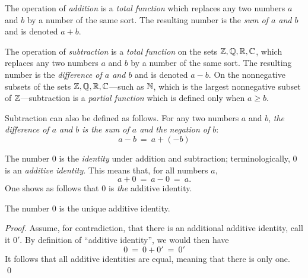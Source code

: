 The operation of {\it addition} is a {\em total function} which replaces any two numbers $a$ and $b$ by a number of the same sort.  The resulting number is the {\em sum of $a$ and $b$} and is denoted $a+b$.

\smallskip

 
\noindent
The operation of {\it subtraction} is a {\em total function} on the sets $\mathbb{Z}, \mathbb{Q}, \mathbb{R}, \mathbb{C}$, which replaces any two numbers $a$ and $b$ by a number of the same sort.  The resulting number is the {\em difference of $a$ and $b$} and is denoted $a-b$.  On the nonnegative subsets of the sets $\mathbb{Z}, \mathbb{Q}, \mathbb{R}, \mathbb{C}$---such as $\mathbb{N}$, which is the largest nonnegative subset of $\mathbb{Z}$---subtraction is a {\em partial function} which is defined only when $a \geq b$.

\smallskip

Subtraction can also be defined as follows.  For any two numbers $a$ and $b$, {\em the difference of $a$ and $b$ is the sum of $a$ and the negation of $b$}:
\[ a-b \ = \ a + (-b) \]

\medskip


The number $0$ is the {\it identity} under addition and subtraction; terminologically, $0$ is an {\it additive identity}.  This means that, for all numbers $a$,
\[ a+0 \ = \ a-0 \ = \ a. \]
One shows as follows that $0$ is {\em the} additive identity.

\begin{prop}
\label{thm:unique-add-iden}
The number $0$ is the unique additive identity.
\end{prop}

\begin{proof}
Assume, for contradiction, that there is an additional additive identity, call it $0'$.  By definition of ``additive identity'', we would then have
\[ 0 \ = \ 0 + 0' \ = \ 0' \]
It follows that all additive identities are equal, meaning that there is only one.  \qed
\end{proof}

\medskip

